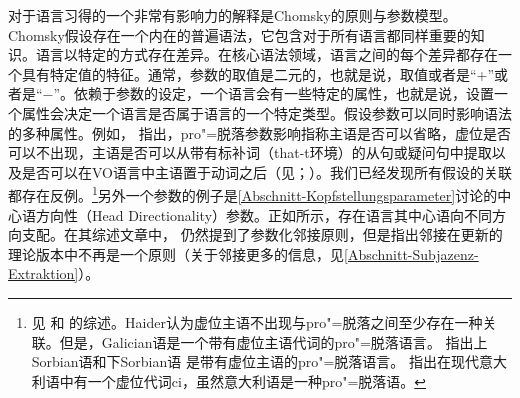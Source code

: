 对于语言习得的一个非常有影响力的解释是Chomsky的原则与参数模型\citeyearpar{Chomsky81a}。Chomsky假设存在一个内在的普遍语法，它包含对于所有语言都同样重要的知识。语言以特定的方式存在差异。在核心语法领域，语言之间的每个差异都存在一个具有特定值的特征。通常，参数的取值是二元的，也就是说，取值或者是“+”或者是“$-$”。依赖于参数的设定，一个语言会有一些特定的属性，也就是说，设置一个属性会决定一个语言是否属于语言的一个特定类型。假设参数可以同时影响语法的多种属性\citep[]{Chomsky81a}。例如， \citet{Rizzi86a}指出，pro"=脱落参数影响指称主语是否可以省略，虚位是否可以不出现，主语是否可以从带有标补词（that-t环境）的从句或疑问句中提取以及是否可以在VO语言中主语置于动词之后（见\citealp[\S~4.3]{Chomsky81a}；\citealp[]{Meisel95a}）。我们已经发现所有假设的关联都存在反例。\footnote{%
\label{fn-Expletiva-Pro-Drop}%
见 和 的综述。Haider认为虚位主语不出现与pro"=脱落之间至少存在一种关联。但是，Galician语是一个带有虚位主语代词的pro"=脱落语言\citep[\S~2.5]{RU90a-u}。 \citet[]{Franks95a-u}指出上Sorbian语和下Sorbian语 是带有虚位主语的pro"=脱落语言。 \citet[]{SP2002b}指出在现代意大利语中有一个虚位代词ci，虽然意大利语是一种pro"=脱落语。  
}另外一个参数的例子是\ref{Abschnitt-Kopfstellungsparameter}讨论的中心语方向性（Head Directionality）参数。正如所示，存在语言其中心语向不同方向支配。在其综述文章中， \citet{Haider2001a}仍然提到了参数化邻接原则，但是指出邻接在更新的理论版本中不再是一个原则（关于邻接更多的信息，见\ref{Abschnitt-Subjazenz-Extraktion}）。
